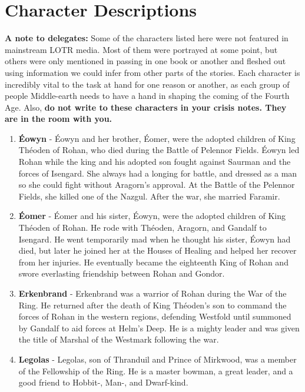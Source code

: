 \documentclass[10pt, letterpaper]{article}
\begin{document}
\newpage

\section{Character Descriptions}
\textbf{A note to delegates:} Some of the characters listed here were
not featured in mainstream LOTR media. Most of them were portrayed at
some point, but others were only mentioned in passing in one book or
another and fleshed out using information we could infer from other
parts of the stories. Each character is incredibly vital to the task at
hand for one reason or another, as each group of people Middle-earth
needs to have a hand in shaping the coming of the Fourth Age. Also,
\textbf{do not write to these characters in your crisis notes. They are
in the room with you.}

\begin{enumerate}
\def\labelenumi{\arabic{enumi}.}
\item
  \textbf{Éowyn} - Éowyn and her brother, Éomer, were the adopted
  children of King Théoden of Rohan, who died during the Battle of
  Pelennor Fields. Éowyn led Rohan while the king and his adopted son
  fought against Saurman and the forces of Isengard. She always had a
  longing for battle, and dressed as a man so she could fight without
  Aragorn's approval. At the Battle of the Pelennor Fields, she killed
  one of the Nazgul. After the war, she married Faramir.
\item
  \textbf{Éomer} - Éomer and his sister, Éowyn, were the adopted
  children of King Théoden of Rohan. He rode with Théoden, Aragorn, and
  Gandalf to Isengard. He went temporarily mad when he thought his
  sister, Éowyn had died, but later he joined her at the Houses of
  Healing and helped her recover from her injuries. He eventually became
  the eighteenth King of Rohan and swore everlasting friendship between
  Rohan and Gondor.
\item
  \textbf{Erkenbrand} - Erkenbrand was a warrior of Rohan during the War
  of the Ring. He returned after the death of King Théoden's son to
  command the forces of Rohan in the western regions, defending Westfold
  until summoned by Gandalf to aid forces at Helm's Deep. He is a mighty
  leader and was given the title of Marshal of the Westmark following
  the war.
\item
  \textbf{Legolas} - Legolas, son of Thranduil and Prince of Mirkwood,
  was a member of the Fellowship of the Ring. He is a master bowman, a
  great leader, and a good friend to Hobbit-, Man-, and Dwarf-kind.

\end{enumerate}
\end{document}
